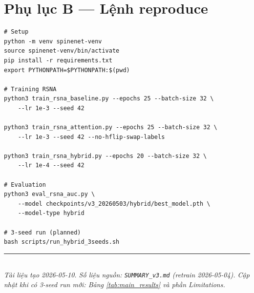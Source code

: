 \documentclass[11pt,a4paper]{article}
\begin{document}
\section{Phụ lục B — Lệnh reproduce}

\begin{verbatim}
# Setup
python -m venv spinenet-venv
source spinenet-venv/bin/activate
pip install -r requirements.txt
export PYTHONPATH=$PYTHONPATH:$(pwd)

# Training RSNA
python3 train_rsna_baseline.py --epochs 25 --batch-size 32 \
    --lr 1e-3 --seed 42

python3 train_rsna_attention.py --epochs 25 --batch-size 32 \
    --lr 1e-3 --seed 42 --no-hflip-swap-labels

python3 train_rsna_hybrid.py --epochs 20 --batch-size 32 \
    --lr 1e-4 --seed 42

# Evaluation
python3 eval_rsna_auc.py \
    --model checkpoints/v3_20260503/hybrid/best_model.pth \
    --model-type hybrid

# 3-seed run (planned)
bash scripts/run_hybrid_3seeds.sh
\end{verbatim}

\vspace{2em}
\noindent\rule{\textwidth}{0.4pt}\\
\textit{Tài liệu tạo 2026-05-10. Số liệu nguồn: \texttt{SUMMARY\_v3.md}
(retrain 2026-05-04). Cập nhật khi có 3-seed run mới: Bảng
\ref{tab:main_results} và phần Limitations.}
\end{document}
